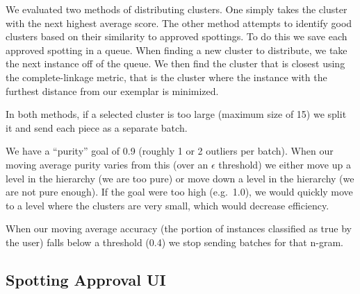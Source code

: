 \documentclass[ms,electronic,twosidetoc,letterpaper,chaptercenter,parttop,lof,lot]{byumsphd}
\begin{document}
We evaluated two methods of distributing clusters.
One simply takes the cluster with the next highest average score.
The other method attempts to identify good clusters based on their similarity to approved spottings. To do this we save each approved spotting in a queue. When finding a new cluster to distribute, we take the next instance off of the queue. We then find the cluster that is closest using the complete-linkage metric, that is the cluster where the instance with the furthest distance from our exemplar is minimized.

In both methods, if a selected cluster is too large (maximum size of 15) we split it and send each piece as a separate batch.

We have a ``purity'' goal of 0.9 (roughly 1 or 2 outliers per batch). When our moving average purity varies from this (over an $\epsilon$ threshold) we either move up a level in the hierarchy (we are too pure) or move down a level in the hierarchy (we are not pure enough). If the goal were too high (e.g.~1.0), we would quickly move to a level where the clusters are very small, which would decrease efficiency.

When our moving average accuracy (the portion of instances classified as true by the user) falls below a threshold (0.4) we stop sending batches for that n-gram.

\subsection{Spotting Approval UI}
\end{document}
